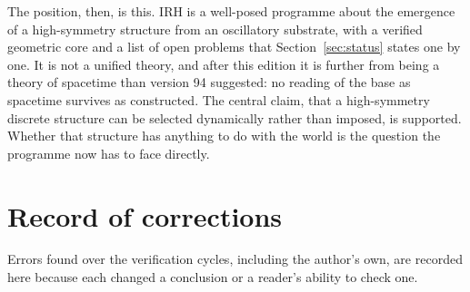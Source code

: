 \documentclass[a4paper,11pt]{article}
\numberwithin{equation}{section}
\theoremstyle{jsplain}
\theoremstyle{jsrem}
\begin{document}
The position, then, is this. IRH is a well-posed programme about the emergence of a high-symmetry structure from an oscillatory substrate, with a verified geometric core and a list of open problems that Section~\ref{sec:status} states one by one. It is not a unified theory, and after this edition it is further from being a theory of spacetime than version 94 suggested: no reading of the base as spacetime survives as constructed. The central claim, that a high-symmetry discrete structure can be selected dynamically rather than imposed, is supported. Whether that structure has anything to do with the world is the question the programme now has to face directly.

\appendix

\section{Record of corrections}\label{app:corrections}

Errors found over the verification cycles, including the author's own, are recorded here because each changed a conclusion or a reader's ability to check one.
\end{document}

